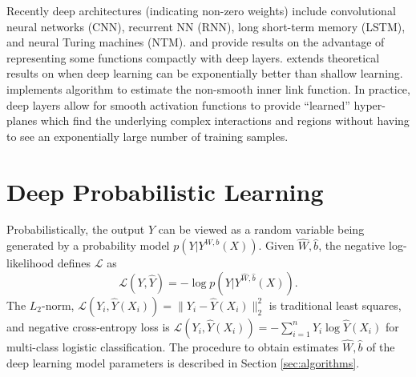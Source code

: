 \documentclass[12pt]{article}
\begin{document}
Recently deep architectures (indicating non-zero weights) include convolutional neural networks (CNN), recurrent NN (RNN), long short-term memory (LSTM), and neural Turing machines (NTM).
\cite{pascanu_how_2013} and \cite{montufar_when_2015} provide results on the advantage of representing some functions compactly with deep layers. 
\cite{poggio_deep_2016} extends theoretical results on when deep learning can be exponentially better than shallow learning. 
\cite{bryant_analysis_2008} implements \cite{sprecher_survey_1972} algorithm to estimate the non-smooth inner link function.  In practice, deep layers allow for smooth activation functions to provide ``learned''  hyper-planes which find the underlying complex interactions and regions  without having to see an exponentially large number of training samples. 
 
\section{Deep Probabilistic Learning}
Probabilistically, the output $Y$ can be viewed as a random variable being generated by a probability 
model $p(Y| Y^{W,b}(X))$. Given $\hat{W},\hat{b}$, the negative log-likelihood defines $ \mathcal{L} $ as 
$$\mathcal{L}(Y, \hat{Y} ) = - \log p( Y| Y^{ \hat{W} , \hat{b} } (X) ). $$
The $L_2$-norm, $ \mathcal{L}( Y_i , \hat{Y}( X_i)) = \|Y_i - \hat{Y}( X_i)\|^2_2  $ is traditional least squares, and negative cross-entropy loss is 
$\mathcal{L}( Y_i , \hat{Y}( X_i)) = -\sum_{i=1}^n Y_i \log \hat{Y} ( X_i )$ for multi-class logistic classification. The procedure to obtain estimates $\hat{W},\hat{b}$ of the deep learning model parameters is described in  Section \ref{sec:algorithms}.	
\end{document}
